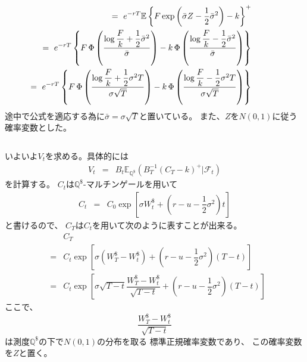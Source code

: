 \documentclass[uplatex,a4j,12pt,dvipdfmx]{jsarticle}
\begin{document}
%
%
\begin{eqnarray*}
	&&
	\hspace{-15mm}
	= \
	e^{-rT}
	\mathbb{E}
	\left\{
	F
	\exp
	\left(
	\bar{\sigma} Z - \dfrac{1}{2} \bar{\sigma}^{2}
	\right)
	-k
	\right\}^{+}
	\\
	&&
	\hspace{-15mm}
	= \
	e^{-rT}
	\left\{
	F \ \! \Phi
	\left(
	\dfrac{
		\log \dfrac{F}{k} + \dfrac{1}{2} \bar{\sigma}^{2}
	}
	{\bar{\sigma}}
	\right)
	-
	k \ \! \Phi \left(
	\dfrac{
		\log \dfrac{F}{k} - \dfrac{1}{2} \bar{\sigma}^{2}
	}
	{\bar{\sigma}}
	\right)
	\right\}
	\\
	&&
	\hspace{-15mm}
	= \
	e^{-rT}
	\left\{
	F \ \! \Phi
	\left(
	\dfrac{
		\log \dfrac{F}{k} + \dfrac{1}{2} \sigma^{2} T
	}
	{\sigma \sqrt{T}}
	\right)
	-
	k \ \! \Phi \left(
	\dfrac{
		\log \dfrac{F}{k} - \dfrac{1}{2} \sigma^{2} T
	}
	{\sigma \sqrt{T}}
	\right)
	\right\}
\end{eqnarray*}
%
%
途中で公式を適応する為に$\bar{\sigma} = \sigma \sqrt{T}$と置いている。
また、$Z$を$N(0,1)$に従う確率変数とした。

${}$

いよいよ$V_{t}$を求める。具体的には
%
%
\begin{eqnarray*}
	V_{t}
	&=&
	B_{t}
	\mathbb{E}_{\mathbb{Q}^{ \$ }}
	( B_{T}^{-1} ( C_{T} - k )^{+} | \mathcal{F}_{t} )
\end{eqnarray*}
%
%
を計算する。
$C_{t}$は$\mathbb{Q}^{ \$ }$-マルチンゲールを用いて
%
%
\begin{eqnarray*}
	C_{t}
	&=&
	C_{0}
	\exp
	\left[
		\sigma W^{\$}_{t}
		+
		\left(
		r - u -
		\dfrac{1}{2}
		\sigma^{2}
		\right) t
		\right]
\end{eqnarray*}
%
%
と書けるので、
$C_{T}$は$C_{t}$を用いて次のように表すことが出来る。
%
%
\begin{eqnarray*}
	&&
	C_{T}
	\\ &=&
	C_{t}
	\exp
	\left[
		\sigma ( W^{\$}_{T} - W^{\$}_{t} )
		+
		\left(
		r - u -
		\dfrac{1}{2}
		\sigma^{2}
		\right) (T-t)
		\right]
	\\ &=&
	C_{t}
	\exp
	\left[
		\sigma \sqrt{T-t}
		\dfrac{W^{\$}_{T} - W^{\$}_{t}}{\sqrt{T-t}}
		+
		\left(
		r - u -
		\dfrac{1}{2}
		\sigma^{2}
		\right) (T-t)
		\right]
\end{eqnarray*}
%
%
ここで、
$$
	\dfrac{W^{\$}_{T} - W^{\$}_{t}}{\sqrt{T-t}}
$$
は測度$\mathbb{Q}^{ \$ }$の下で$N(0,1)$の分布を取る
標準正規確率変数であり、
この確率変数を$Z$と置く。
\end{document}
